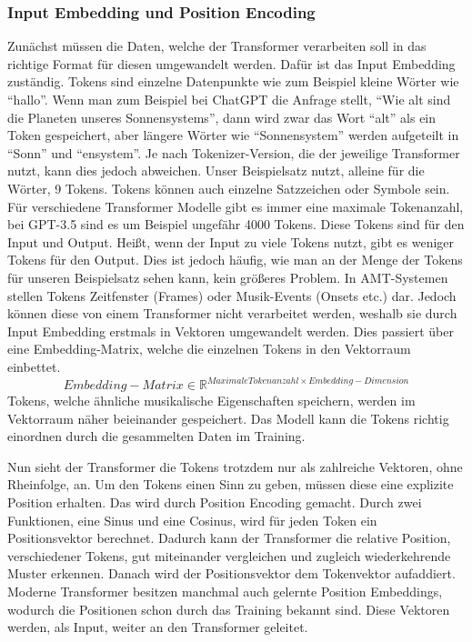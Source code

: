 \subsubsection{Input Embedding und Position Encoding}
Zunächst müssen die Daten, welche der Transformer verarbeiten soll in das richtige Format für diesen umgewandelt werden.
Dafür ist das Input Embedding zuständig.
Tokens sind einzelne Datenpunkte wie zum Beispiel kleine Wörter wie \enquote{hallo}.
Wenn man zum Beispiel bei ChatGPT die Anfrage stellt, \enquote{Wie alt sind die Planeten unseres Sonnensystems},
dann wird zwar das Wort \enquote{alt} als ein Token gespeichert, aber längere Wörter wie \enquote{Sonnensystem}
werden aufgeteilt in \enquote{Sonn} und \enquote{ensystem}.
Je nach Tokenizer-Version, die der jeweilige Transformer nutzt, kann dies jedoch abweichen.
Unser Beispielsatz nutzt, alleine für die Wörter, 9 Tokens.
Tokens können auch einzelne Satzzeichen oder Symbole sein.
Für verschiedene Transformer Modelle gibt es immer eine maximale Tokenanzahl,
bei GPT-3.5 sind es um Beispiel ungefähr 4000 Tokens.
Diese Tokens sind für den Input und Output.
Heißt, wenn der Input zu viele Tokens nutzt, gibt es weniger Tokens für den Output.
Dies ist jedoch häufig, wie man an der Menge der Tokens für unseren Beispielsatz sehen kann, kein größeres Problem.
In AMT-Systemen stellen Tokens Zeitfenster (Frames) oder Musik-Events (Onsets etc.) dar.
Jedoch können diese von einem Transformer nicht verarbeitet werden,
weshalb sie durch Input Embedding erstmals in Vektoren  umgewandelt werden.
Dies passiert über eine Embedding-Matrix, welche die einzelnen Tokens in den Vektorraum einbettet.
\[
Embedding-Matrix \in \mathbb{R}^{Maximale Tokenanzahl \times Embedding-Dimension}
\]
Tokens, welche ähnliche musikalische Eigenschaften speichern, werden im Vektorraum näher beieinander gespeichert.
Das Modell kann die Tokens richtig einordnen durch die gesammelten Daten im Training.

Nun sieht der Transformer die Tokens trotzdem nur als zahlreiche Vektoren, ohne Rheinfolge, an.
Um den Tokens einen Sinn zu geben, müssen diese eine explizite Position erhalten.
Das wird durch Position Encoding gemacht.
Durch zwei Funktionen, eine Sinus und eine Cosinus, wird für jeden Token ein Positionsvektor berechnet.
Dadurch kann der Transformer die relative Position, verschiedener Tokens,
gut miteinander vergleichen und zugleich wiederkehrende Muster erkennen.
Danach wird der Positionsvektor dem Tokenvektor aufaddiert.
Moderne Transformer besitzen manchmal auch gelernte Position Embeddings,
wodurch die Positionen schon durch das Training bekannt sind.
Diese Vektoren werden, als Input, weiter an den Transformer geleitet.

